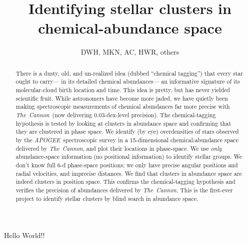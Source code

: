 \documentclass[12pt, letterpaper, preprint]{aastex}
\newcommand{\acronym}[1]{{\small{#1}}}
\newcommand{\project}[1]{\textsl{#1}}
\newcommand{\apogee}{\acronym{\project{APOGEE}}}
\newcommand{\thecannon}{\project{The~Cannon}}
\begin{document}
\title{Identifying stellar clusters in chemical-abundance space}
\author{DWH, MKN, AC, HWR, others}

\begin{abstract}
There is a dusty, old, and un-realized idea (dubbed ``chemical tagging'')
that every star ought to carry---%
in its detailed chemical abundances---%
an informative signature of its molecular-cloud birth location and time.
This idea is pretty, but has never yielded scientific fruit.
While astronomers have become more jaded, we have quietly been making
spectroscopic measurements of chemical abundances far more precise with \thecannon\ 
(now delivering 0.03-dex-level precision).
The chemical-tagging hypothesis is tested by looking at clusters in abundance space
and confirming that they are clustered in phase space.
We identify (by eye) overdensities of stars observed by the \apogee\ spectroscopic survey
in a 15-dimensional chemical-abundance space delivered by \thecannon,
and plot their locations in phase-space.
We use \emph{only} abundance-space information (no positional information) to identify stellar groups.
We don't know full 6-d phase-space positions;
we only have precise angular positions and radial velocities, and imprecise distances.
We find that clusters in abundance space are indeed clusters in position space.
This confirms the chemical-tagging hypothesis and
verifies the precision of abundances delivered by \thecannon.
This is the first-ever project to identify stellar clusters by blind search in abundance space.
\end{abstract}

Hello World!!
\end{document}
